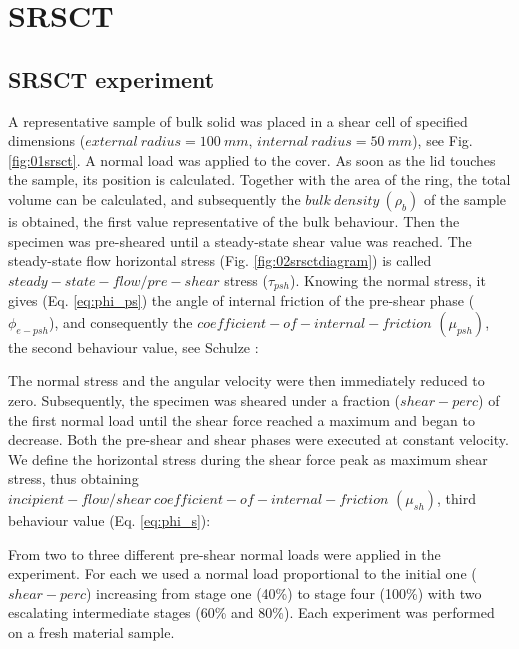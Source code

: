 \begin{appendix}
\label{appendix}

\section{SRSCT}
\label{sec:srsct}

\subsection{SRSCT experiment}
\label{subsec:srsctexperiment}
A representative sample of bulk solid was placed in a shear cell of specified
dimensions ($external ~ radius = 100 ~ mm$, $internal ~ radius = 50 ~ mm$),
see Fig. \ref{fig:01srsct}.
% 
A normal load was applied to the cover. As soon as the lid touches the sample, its position is calculated.
Together with the area of the ring, the total volume can be calculated, and subsequently the $bulk ~ density ~ (\rho_b)$ 
of the sample is obtained, the first value representative of the bulk behaviour.
Then the specimen was pre-sheared until a steady-state shear value was reached.
The steady-state flow horizontal stress (Fig. \ref{fig:02srsctdiagram}) is called $steady-state-flow/pre-shear$ stress ($\tau_{psh}$).
Knowing the normal stress, it gives (Eq. \ref{eq:phi_ps}) the angle of internal friction of the pre-shear phase ($\phi_{e-psh}$), 
and consequently the $coefficient-of-internal-friction $ $ (\mu_{psh})$, the
second behaviour value, see Schulze \cite{RefWorks:118}:
   
% 
The normal stress and the angular velocity were then immediately reduced to zero. 
Subsequently, the specimen was sheared under a fraction ($shear-perc$) of the first normal load until the shear force 
reached a maximum and began to decrease. 
Both the pre-shear and shear phases were executed at constant velocity. 
We define the horizontal stress during the shear force peak as maximum shear stress, 
thus obtaining $incipient-flow/shear ~ coefficient-of-internal-friction $ $ (\mu_{sh})$, 
third behaviour value (Eq. \ref{eq:phi_s})\cite{RefWorks:118}:
 
From two to three different pre-shear normal loads were applied in the experiment. 
For each we used a normal load proportional to the initial one ($shear-perc$) increasing from stage one (40\%) 
to stage four (100\%) with two escalating intermediate stages (60\% and 80\%).
Each experiment was performed on a fresh material sample. \\





\end{appendix}

